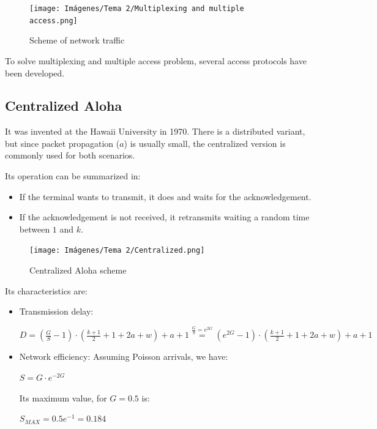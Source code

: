 \documentclass[
	12pt,
	twoside
]{book}
\begin{document}
\begin{figure}[H]
	\centering
	\texttt{[image: Imágenes/Tema 2/Multiplexing and multiple access.png]}
	\caption{
		\label{fig:unit2_mul}
		Scheme of network traffic
	}
\end{figure}

To solve multiplexing and multiple access problem, several access protocols have been developed.

\subsection{Centralized Aloha}

It was invented at the Hawaii University in 1970. There is a distributed variant, but since packet propagation ($a$) is usually small, the centralized version is commonly used for both scenarios.

Its operation can be summarized in:

\begin{itemize}
	\item If the terminal wants to transmit, it does and waits for the acknowledgement.
	\item If the acknowledgement is not received, it retransmits waiting a random time between $1$ and $k$.
\end{itemize}

\begin{figure}[H]
	\centering
	\texttt{[image: Imágenes/Tema 2/Centralized.png]}
	\caption{
		\label{fig:unit2_cen_aloha_sheme}
		Centralized Aloha scheme
	}
\end{figure}

Its characteristics are:

\begin{itemize}
	\item {
		Transmission delay:

		$
			D =
			\left( \frac {G} {S} - 1 \right) \cdot \left( \frac {k+1} {2} + 1 + 2a + w \right) + a + 1 \overset{\frac {G} {S} = e^{2G}}{=}
			\left( e^{2G} - 1 \right) \cdot \left( \frac {k+1} {2} + 1 + 2a + w \right) + a + 1
		$
	}
	\item {
		Network efficiency: Assuming Poisson arrivals, we have:

		$
			S = G \cdot e^{-2G}
		$

		Its maximum value, for $G = 0.5$ is:

		$
			S_{MAX} = 0.5 e^{-1} = 0.184
		$
	}
\end{itemize}
\end{document}
